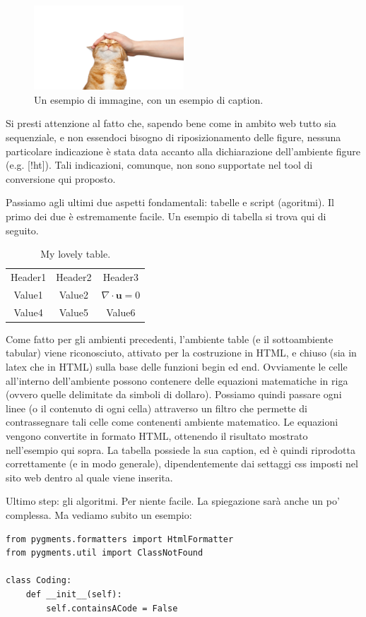 \begin{figure}
\centering
\includegraphics[width=0.5\textwidth]{cat.png}
\caption{Un esempio di immagine, con un esempio di caption.}
\end{figure}

Si presti attenzione al fatto che, sapendo bene come in ambito web tutto sia sequenziale, e non essendoci bisogno di riposizionamento delle figure, nessuna particolare indicazione è stata data accanto alla dichiarazione dell'ambiente figure (e.g. [!ht]). Tali indicazioni, comunque, non sono supportate nel tool di conversione qui proposto.

Passiamo agli ultimi due aspetti fondamentali: tabelle e script (agoritmi). Il primo dei due è estremamente facile. Un esempio di tabella si trova qui di seguito.

\begin{table}
\caption{My lovely table.}
\begin{tabular}{c c c}
Header1 & Header2 & Header3 \\
Value1  & Value2  & $\nabla \cdot \mathbf{u} = 0$ \\
Value4  & Value5  & Value6 \\
\end{tabular}
\end{table}

Come fatto per gli ambienti precedenti, l'ambiente table (e il sottoambiente tabular) viene riconosciuto, attivato per la costruzione in HTML, e chiuso (sia in latex che in HTML) sulla base delle funzioni begin ed end. Ovviamente le celle all'interno dell'ambiente possono contenere delle equazioni matematiche in riga (ovvero quelle delimitate da simboli di dollaro). Possiamo quindi passare ogni linee (o il contenuto di ogni cella) attraverso un filtro che permette di contrassegnare tali celle come contenenti ambiente matematico. Le equazioni vengono convertite in formato HTML, ottenendo il risultato mostrato nell'esempio qui sopra. La tabella possiede la sua caption, ed è quindi riprodotta correttamente (e in modo generale), dipendentemente dai settaggi css imposti nel sito web dentro al quale viene inserita.

Ultimo step: gli algoritmi. Per niente facile. La spiegazione sarà anche un po' complessa. Ma vediamo subito un esempio:
\begin{verbatim}
from pygments.formatters import HtmlFormatter
from pygments.util import ClassNotFound

class Coding:
    def __init__(self):
        self.containsACode = False
\end{verbatim}
